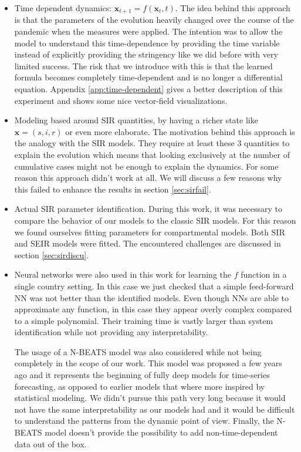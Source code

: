 \documentclass[12pt, letterpaper]{article}
\begin{document}
\begin{itemize} 
	\item Time dependent dynamics: $\mathbf{x}_{t+1} = f(\mathbf{x}_t, t)$. 
	The idea behind this approach is that the parameters of the evolution heavily changed over the course of the pandemic when the measures were applied. 
	The intention was to allow the model to understand this time-dependence by providing the time variable instead of explicitly providing the stringency like we did before with very limited success. 
	The risk that we introduce with this is that the learned formula becomes completely time-dependent and is no longer a differential equation.
	Appendix \ref{app:time-dependent} gives a better description of this experiment and shows some nice vector-field visualizations.

	\item Modeling based around SIR quantities, by having a richer state like $\mathbf{x} = (s, i, r)$ or even more elaborate. 
	The motivation behind this approach is the analogy with the SIR models.
	They require at least these 3 quantities to explain the evolution which means that looking exclusively at the number of cumulative cases might not be enough to explain the dynamics. For some reason this approach didn't work at all. We will discuss a few reasons why this failed to enhance the results in section \ref{sec:sirfail}.

	\item Actual SIR parameter identification. During this work, it was necessary to compare the behavior of our models to the classic SIR models. 
	For this reason we found ourselves fitting parameters for compartmental models. Both SIR and SEIR models were fitted. The encountered challenges are discussed in section \ref{sec:sirdiscu}.

	\item Neural networks were also used in this work for learning the $f$ function in a single country setting. 
	In this case we just checked that a simple feed-forward NN was not better than the identified models. 
	Even though NNs are able to approximate any function, in this case they appear overly complex compared to a simple polynomial. 
	Their training time is vastly larger than system identification while not providing any interpretability.

	The usage of a N-BEATS \cite{nbeats} model was also considered while not being completely in the scope of our work. 
	This model was proposed a few years ago and it represents the beginning of fully deep models for time-series forecasting, as opposed to earlier models that where more inspired by statistical modeling. 
	We didn't pursue this path very long because it would not have the same interpretability as our models had and it would be difficult to understand the patterns from the dynamic point of view. Finally, the N-BEATS model doesn't provide the possibility to add non-time-dependent data out of the box.


\end{itemize}
\end{document}
